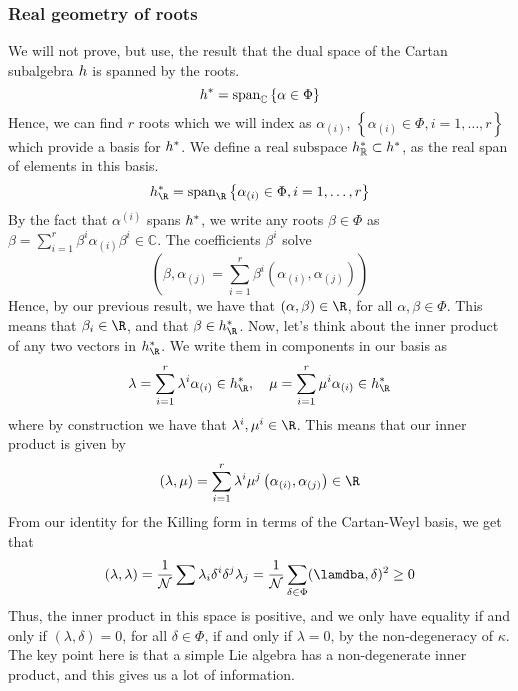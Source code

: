 \subsubsection{Real geometry of roots} 
We will not prove, but use, the result 
that the dual space of the Cartan subalgebra  $ h $ 
is spanned by the roots. 
\[
	h ^ *  = \text{span} _{ \mathbb { C} } \left\{  
	\alpha \in \Phi \right\}  
\] Hence, we can find $ r $ roots 
which we will index as $ \alpha _{ ( i )  } $, 
$ \left\{  \alpha_{ \left(  i  \right)  } \in \Phi, i = 1 , \dots, r  \right\}   $ 
which provide a basis for $ h  ^ * $. 
We define a real subspace $ h^ * _{ \mathbb{ R} } \subset 
h ^ * $, as the real span of elements in this basis. 
\[
 h^ * _{ \R }  = \text{span}_{ \R } \left\{  
 \alpha _{ \left(  i  \right)  } \in \Phi , i =  1 , \dots, r \right\}  
\] 
By the fact that $ \alpha ^{ ( i ) } $ spans $ h ^ * $, 
we write any roots $ \beta \in \Phi $  as 
$ \beta = \sum_{ i  = 1} ^ r \beta ^ i \alpha _{ ( i ) } \beta ^ i \in 
\mathbb{ C} $. The coefficients $ \beta ^ i  $  solve 
\[
	\left( \beta , \alpha _{ ( j ) }  = 
	\sum_{ i  =1 } ^ r \beta ^ i \left(  \alpha _{( i ) } , \alpha _{ ( j ) } \right) \right)  
\] Hence, by our previous result, 
we have that $ \left(  \alpha, \beta  \right)  \in \R $, 
for all $ \alpha , \beta \in \Phi  $. 
This means that $ \beta _ i \in \R $, and that 
$ \beta \in \subalg ^ * _{ \R } $. 
Now, let's think about the inner product 
of any two vectors in $ \subalg ^ *_{ \R } $. 
We write them in components in our basis as 
\[
	\lambda = \sum_{ i = 1 } ^ r \lambda ^ i \alpha _{ ( i ) } \in 
	\subalg ^ * _{ \R } , \quad \mu = \sum_{ i = 1 } ^ r \mu ^ i 
	\alpha _{ ( i ) } \in \subalg ^ * _{ \R } 
\] where by construction we have that $ \lambda ^ i , \mu ^ i \in \R $. 
This means that our inner product is given by 
\[
 \left(  \lambda , \mu  \right)   = \sum_{ i =1 }^ r 
 \lambda ^ i \mu ^ j \left(  \alpha _{ ( i ) } , \alpha_{ ( j ) }  \right)  \in 
 \R 
\]  From our identity for the Killing form 
in terms of the Cartan-Weyl basis, we get that 
\[
 ( \lambda , \lambda )  = \frac{1}{\mathcal{ N } } \sum 
 \lambda _ i \delta ^ i \delta ^ j \lambda _ j  = \frac{1}{\mathcal{ N } } 
 \sum_{ \delta \in \Phi } ( \lamdba , \delta ) ^ 2 \geq 0 
\] Thus, the inner product 
in this space is positive, and we only have equality 
if and only if $ \left(  \lambda , \delta  \right)   =0 $, 
for all $ \delta \in \Phi $, if and only if $ \lambda = 0 $, 
by the non-degeneracy of $ \kappa $. 
The key point here is that a simple Lie algebra 
has a non-degenerate inner product, and this gives 
us a lot of information. 

